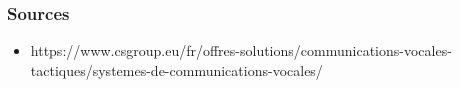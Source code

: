 \begin{frame}
    \frametitle{Sources}
    \begin{itemize}
        \item https://www.csgroup.eu/fr/offres-solutions/communications-vocales-tactiques/systemes-de-communications-vocales/
    \end{itemize}
\end{frame}